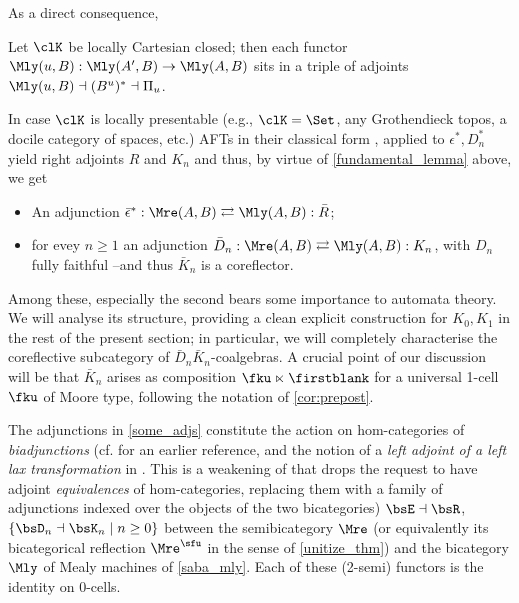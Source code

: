 As a direct consequence,
\begin{remark}\label{some_adjoints_btwn_Mly}
  Let $\clK$ be locally Cartesian closed; then each functor $\Mly(u,B) : \Mly(A',B)\to \Mly(A,B)$ sits in a triple of adjoints $\Mly(u,B) \dashv (B^u)^* \dashv \Pi_u$.
\end{remark}
\color{black}
\begin{remark}\label{some_adjs}
  In case $\clK$ is locally presentable (e.g., $\clK=\Set$, any Grothendieck topos, a docile category of spaces, etc.) AFTs in their classical form \cite[Ch. 5]{Bor2}, \cite[3.3.3---3.3.8]{Bor1} applied to $\epsilon^*, D_n^*$ yield right adjoints $R$ and $K_n$ and thus, by virtue of \autoref{fundamental_lemma} above, we get
  \begin{itemize}
    \item An adjunction $\bar \epsilon^* : \Mre(A,B)\rightleftarrows \Mly(A,B) : \bar R$;
    \item for evey $n\ge 1$ an adjunction $\bar D_n : \Mre(A,B)\rightleftarrows \Mly(A,B)  : K_n$, with $D_n$ fully faithful --and thus $\bar K_n$ is a coreflector.
  \end{itemize}
\end{remark}
Among these, especially the second bears some importance to automata theory. We will analyse its structure, providing a clean explicit construction for $K_0, K_1$ in the rest of the present section; in particular, we will completely characterise the coreflective subcategory of $\bar D_n\bar K_n$-coalgebras. A crucial point of our discussion will be that $\bar K_n$ arises as composition $\fku\ltimes\firstblank$ for a universal 1-cell $\fku$ of Moore type, following the notation of \autoref{cor:prepost}.
\begin{remark}
  The adjunctions in \autoref{some_adjs} constitute the action on hom-categories of \emph{biadjunctions} (cf. \cite{betti1981quasi} for an earlier reference, and the notion of a \emph{left adjoint of a left lax transformation} in \cite[p. 8]{CTGDC_1972__13_3_217_0}. This is a weakening of \cite[Ch. 9]{fiore} that drops the request to have adjoint \emph{equivalences} of hom-categories, replacing them with a family of adjunctions indexed over the objects of the two bicategories) $\bsE\dashv \bsR$, $\{\bsD_n\dashv \bsK_n \mid n\ge 0\}$
  between the semibicategory $\Mre$ (or equivalently its bicategorical reflection $\Mre^\un$ in the sense of \autoref{unitize_thm}) and the bicategory $\Mly$ of Mealy machines of \autoref{saba_mly}. Each of these (2-semi) functors is the identity on 0-cells.
\end{remark}
